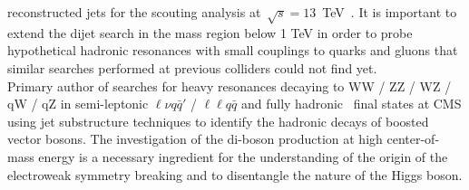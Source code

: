 \documentclass[10pt, a4paper]{article}
\newcommand{\years}[1]{\marginnote{\hskip-0.2in{\scriptsize #1}}}
\begin{document}
reconstructed jets for the scouting analysis
at~$\sqrt{s}=13$~TeV~\cite{Sirunyan:2016iap,AN-16-202}. 
It is important to extend the dijet search in the mass region below 1 TeV 
in order to probe hypothetical hadronic resonances with small
couplings to quarks and gluons that similar searches performed at
previous colliders could not find yet. \\ [1em] 
\years{12/2011 - 09/2014}Primary author of searches for heavy
resonances decaying to WW / ZZ / WZ / qW / qZ in semi-leptonic $\ell\nu q\bar{q}'$ / $\ell\ell q\bar{q}$ \cite{Khachatryan:2014gha,AN-13-045,AN-13-040} and fully hadronic~\cite{Khachatryan:2014hpa,AN-12-393,Chatrchyan:2012yxa,AN-11-524} final states at CMS using jet substructure techniques to identify the hadronic decays of boosted vector bosons. The investigation of the di-boson 
production at high center-of-mass energy is a necessary ingredient for the understanding of the origin of the electroweak symmetry breaking and to disentangle the nature of the Higgs boson. \\ [1em] 
\end{document}
